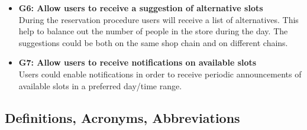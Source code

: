 \documentclass[table, 12pt]{article}
\begin{document}
\begin{itemize}
    \item {\textbf{G6: Allow users to receive a suggestion of alternative slots}\\During the reservation procedure users will receive a list of alternatives. This help to balance out the number of people in the store during the day. The suggestions could be both on the same shop chain and on different chains.}
    \item {\textbf{G7: Allow users to receive notifications on available slots}\\Users could enable notifications in order to receive periodic announcements of available slots in a preferred day/time range.}
\end{itemize}
\subsection{Definitions, Acronyms, Abbreviations}
\end{document}
